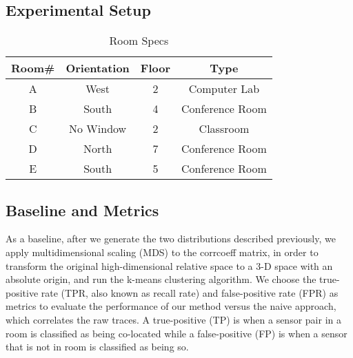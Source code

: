 \subsection{Experimental Setup}
\begin{table}[ht!]
\caption{Room Specs}
\centering %
\begin{tabular}{c c c c}%
\hline %
Room\# & Orientation & Floor & Type \\ %
\hline\hline %
A & West & 2 & Computer Lab \\ %
B & South & 4 & Conference Room \\
C & No Window & 2 & Classroom \\
D & North & 7 & Conference Room \\
E & South & 5 & Conference Room \\ %
\hline %
\end{tabular}
\label{table:roomspec} %
\end{table}

\subsection{Baseline and Metrics}

As a baseline, after we generate the two distributions described previously, we apply multidimensional scaling (MDS) to the corrcoeff matrix, in order to transform the original high-dimensional relative space to a 3-D space with an absolute origin, and run the k-means clustering algorithm.
We choose the true-positive rate (TPR, also known as recall rate) and false-positive rate (FPR) as metrics to evaluate the performance of our method versus the naive approach, which correlates the raw traces. A true-positive (TP) is when a sensor pair in a room is classified as being co-located 
while a false-positive (FP) is when a sensor that is not in room is classified as being so.

